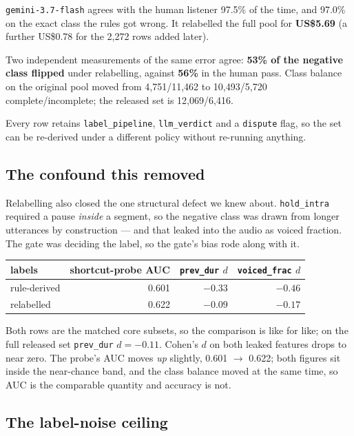 \documentclass[11pt]{article}
\newcommand{\pct}{\%}
\begin{document}
\texttt{gemini-3.7-flash} agrees with the human listener 97.5\pct{} of the time,
and 97.0\pct{} on the exact class the rules got wrong. It relabelled the full
pool for \textbf{US\$5.69} (a further US\$0.78 for the 2,272 rows added later).

Two independent measurements of the same error agree: \textbf{53\pct{} of the
negative class flipped} under relabelling, against \textbf{56\pct{}} in the
human pass. Class balance on the original pool moved from 4,751/11,462 to
10,493/5,720 complete/incomplete; the released set is 12,069/6,416.

Every row retains \texttt{label\_pipeline}, \texttt{llm\_verdict} and a
\texttt{dispute} flag, so the set can be re-derived under a different policy
without re-running anything.

\subsection{The confound this removed}
\label{sec:shortcut}

Relabelling also closed the one structural defect we knew about.
\texttt{hold\_intra} required a pause \emph{inside} a segment, so the negative
class was drawn from longer utterances by construction --- and that leaked into
the audio as voiced fraction. The gate was deciding the label, so the gate's
bias rode along with it.

\begin{center}\small
\begin{tabular}{lrrr}
\toprule
labels & shortcut-probe AUC & \texttt{prev\_dur} $d$ & \texttt{voiced\_frac} $d$ \\
\midrule
rule-derived & 0.601 & $-0.33$ & $-0.46$ \\
relabelled & 0.622 & $\mathbf{-0.09}$ & $\mathbf{-0.17}$ \\
\bottomrule
\end{tabular}
\end{center}

Both rows are the matched core subsets, so the comparison is like for like; on
the full released set \texttt{prev\_dur} $d=-0.11$. Cohen's $d$ on both leaked
features drops to near zero. The probe's AUC moves
\emph{up} slightly, 0.601 $\rightarrow$ 0.622; both figures sit inside the
near-chance band, and the class balance moved at the same time, so AUC is the
comparable quantity and accuracy is not.

\subsection{The label-noise ceiling}
\end{document}
